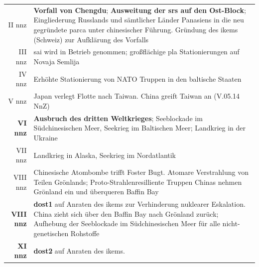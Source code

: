 \begin{longtable}{@{\,}r <{\hskip 2pt} !{\foo} >{\raggedright\arraybackslash}p{11cm}}
  II \ac{nnz}   & \textbf{Vorfall von Chengdu}; \textbf{Ausweitung der \acp{sr} auf den
  Ost-Block}; Eingliederung Russlands und sämtlicher Länder Panasiens in die neu
  gegründete \ac{parca} unter chinesischer Führung. Gründung des \acp{ikem}
  (Schweiz) zur Aufklärung des Vorfalls\\
 III \ac{nnz}  & \ac{sai} wird in Betrieb genommen; großflächige \ac{pla}
  Stationierungen auf Novaja Semlija\\ 
 IV \ac{nnz}   & Erhöhte Stationierung von NATO Truppen in den baltische Staaten \\ 
 V \ac{nnz}    & Japan verlegt Flotte nach Taiwan. China greift Taiwan an
 (V.05.14 NnZ) \\
 \textbf{VI \ac{nnz}} & \textbf{Ausbruch des dritten Weltkrieges}; Seeblockade im
  Südchinesischen Meer, Seekrieg im Baltischen Meer; Landkrieg in der Ukraine \\
 VII \ac{nnz} & Landkrieg in Alaska, Seekrieg im Nordatlantik \\
 VIII \ac{nnz} & Chinesische Atombombe trifft Foster Bugt. Atomare Verstrahlung
  von Teilen Grönlands; Proto-Strahlenresilliente Truppen Chinas nehmen Grönland ein
  und überqueren Baffin Bay \\
 \textbf{VIII \ac{nnz}} & \textbf{\ac{dost1}} auf Anraten des \acp{ikem} zur
  Verhinderung nuklearer Eskalation. China zieht sich über den Baffin Bay nach
  Grönland zurück; Aufhebung der Seeblockade im Südchinesischen Meer für alle
  nicht-genetischen Rohstoffe\\
 \textbf{XI \ac{nnz}} & \textbf{\ac{dost2}} auf Anraten des \acp{ikem}.
\end{longtable}
